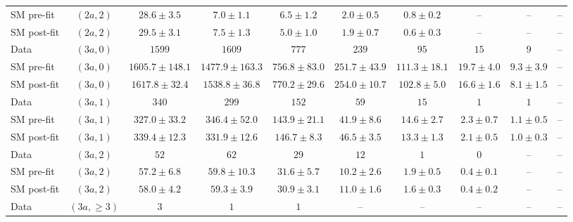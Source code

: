 \begin{table}[h!]
{\begin{tabular}{lccccccccc}
SM pre-fit  & $(2a,2)$           & $28.6\pm3.5$     & $7.0\pm1.1$      & $6.5\pm1.2$    & $2.0\pm0.5$    & $0.8\pm0.2$    & --           & --           & --           \\[0.5ex]
SM post-fit & $(2a,2)$           & $29.5\pm3.1$     & $7.5\pm1.3$      & $5.0\pm1.0$    & $1.9\pm0.7$    & $0.6\pm0.3$    & --           & --           & --           \\[0.5ex]
Data        & $(3a,0)$           & $1599$           & $1609$           & $777$          & $239$          & $95$           & $15$         & $9$          & --           \\[0.5ex]
SM pre-fit  & $(3a,0)$           & $1605.7\pm148.1$ & $1477.9\pm163.3$ & $756.8\pm83.0$ & $251.7\pm43.9$ & $111.3\pm18.1$ & $19.7\pm4.0$ & $9.3\pm3.9$  & --           \\[0.5ex]
SM post-fit & $(3a,0)$           & $1617.8\pm32.4$  & $1538.8\pm36.8$  & $770.2\pm29.6$ & $254.0\pm10.7$ & $102.8\pm5.0$  & $16.6\pm1.6$ & $8.1\pm1.5$  & --           \\[0.5ex]
Data        & $(3a,1)$           & $340$            & $299$            & $152$          & $59$           & $15$           & $1$          & $1$          & --           \\[0.5ex]
SM pre-fit  & $(3a,1)$           & $327.0\pm33.2$   & $346.4\pm52.0$   & $143.9\pm21.1$ & $41.9\pm8.6$   & $14.6\pm2.7$   & $2.3\pm0.7$  & $1.1\pm0.5$  & --           \\[0.5ex]
SM post-fit & $(3a,1)$           & $339.4\pm12.3$   & $331.9\pm12.6$   & $146.7\pm8.3$  & $46.5\pm3.5$   & $13.3\pm1.3$   & $2.1\pm0.5$  & $1.0\pm0.3$  & --           \\[0.5ex]
Data        & $(3a,2)$           & $52$             & $62$             & $29$           & $12$           & $1$            & $0$          & --           & --           \\[0.5ex]
SM pre-fit  & $(3a,2)$           & $57.2\pm6.8$     & $59.8\pm10.3$    & $31.6\pm5.7$   & $10.2\pm2.6$   & $1.9\pm0.5$    & $0.4\pm0.1$  & --           & --           \\[0.5ex]
SM post-fit & $(3a,2)$           & $58.0\pm4.2$     & $59.3\pm3.9$     & $30.9\pm3.1$   & $11.0\pm1.6$   & $1.6\pm0.3$    & $0.4\pm0.2$  & --           & --           \\[0.5ex]
Data        & $(3a,\geq 3)$      & $3$              & $1$              & $1$            & --             & --             & --           & --           & --           \\[0.5ex]

\end{tabular}}
\end{table}
